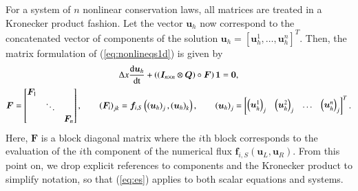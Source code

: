 \documentclass[preprint,10pt]{elsarticle}
\theoremstyle{definition}
\theoremstyle{lemma}
\theoremstyle{theorem}
\theoremstyle{assumption}
\newcommand{\td}[2]{\frac{{\rm d}#1}{{\rm d}{\rm #2}}}
\newcommand{\LRp}[1]{\left( #1 \right)}
\begin{document}
For a system of $n$ nonlinear conservation laws, all matrices are treated in a Kronecker product fashion.  Let the vector $\bm{u}_h$ now correspond to the concatenated vector of components of the solution $\bm{u}_h = [\bm{u}_h^1, \ldots, \bm{u}_h^n]^T$.  Then, the matrix formulation of (\ref{eq:nonlineqs1d}) is given by
\begin{gather*}
\Delta x\td{\bm{u}_h}{t} + \LRp{\LRp{\bm{I}_{n \times n} \otimes \bm{Q} }\circ \bm{F}}\bm{1} = \bm{0},\\
\bm{F} = \begin{bmatrix}
\bm{F}_{1} & &\\
& \ddots &\\
&& \bm{F}_{n} \\
\end{bmatrix}, \qquad 
\LRp{\bm{F}_{i}}_{jk} = \bm{f}_{i,S}\LRp{\LRp{\bm{u}_h}_j, \LRp{\bm{u}_h}_k}, \qquad \LRp{\bm{u}_h}_j = \begin{bmatrix}\LRp{\bm{u}^1_h}_j & \LRp{\bm{u}^2_h}_j & \ldots & \LRp{\bm{u}^n_h}_j\end{bmatrix}^T.
\label{eq:essys}
\end{gather*}
Here, $\bm{F}$ is a block diagonal matrix where the $i$th block corresponds to the evaluation of the $i$th component of the numerical flux $\bm{f}_{i,S}(\bm{u}_L,\bm{u}_R)$.  From this point on, we drop explicit references to components and the Kronecker product to simplify notation, so that (\ref{eq:es}) applies to both scalar equations and systems.
\end{document}
